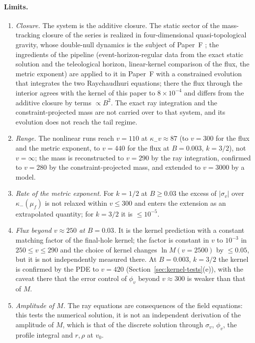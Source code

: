 \documentclass[11pt]{article}
\begin{document}
\paragraph{Limits.}
\begin{enumerate}
\item \emph{Closure.} The system is the additive closure. The static sector of the mass-tracking closure of the series is realized in four-dimensional quasi-topological gravity, whose double-null dynamics is the subject of Paper~F \citep{PaperF}; the ingredients of the pipeline (event-horizon-regular data from the exact static solution and the teleological horizon, linear-kernel comparison of the flux, the metric exponent) are applied to it in Paper~F with a constrained evolution that integrates the two Raychaudhuri equations; there the flux through the interior agrees with the kernel of this paper to $8\times10^{-4}$ and differs from the additive closure by terms $\propto B^{2}$. The exact ray integration and the constraint-projected mass are not carried over to that system, and its evolution does not reach the tail regime.
\item \emph{Range.} The nonlinear runs reach $v=110$ at $\kappa_-v\approx87$ (to $v=300$ for the flux and the metric exponent, to $v=440$ for the flux at $B=0.003$, $k=3/2$), not $v=\infty$; the mass is reconstructed to $v=290$ by the ray integration, confirmed to $v=280$ by the constraint-projected mass, and extended to $v=3000$ by a model.
\item \emph{Rate of the metric exponent.} For $k=1/2$ at $B\ge0.03$ the excess of $|\sigma_v|$ over $\kappa_-(\mu_f)$ is not relaxed within $v\le300$ and enters the extension as an extrapolated quantity; for $k=3/2$ it is $\le10^{-5}$.
\item \emph{Flux beyond $v\approx250$ at $B=0.03$.} It is the kernel prediction with a constant matching factor of the final-hole kernel; the factor is constant in $v$ to $10^{-3}$ in $250\le v\le290$ and the choice of kernel changes $\ln M(v=2500)$ by $\le0.05$, but it is not independently measured there. At $B=0.003$, $k=3/2$ the kernel is confirmed by the PDE to $v=420$ (Section~\ref{sec:kernel-tests}(e)), with the caveat there that the error control of $\phi_v$ beyond $v\approx300$ is weaker than that of $M$.
\item \emph{Amplitude of $M$.} The ray equations are consequences of the field equations: this tests the numerical solution, it is not an independent derivation of the amplitude of $M$, which is that of the discrete solution through $\sigma_v$, $\phi_v$, the profile integral and $r,\rho$ at $v_0$.

\end{enumerate}
\end{document}
